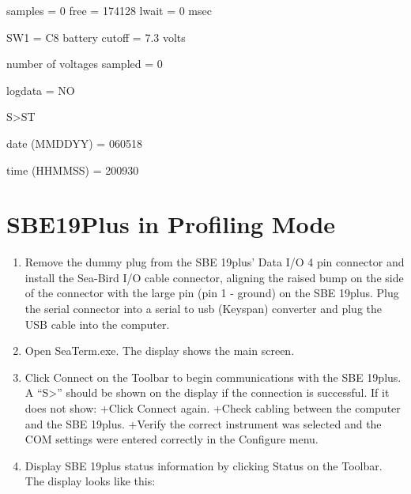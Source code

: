 \documentclass[]{book}
\providecommand{\tightlist}{%
  \setlength{\itemsep}{0pt}\setlength{\parskip}{0pt}}
\begin{document}
samples = 0 free = 174128 lwait = 0 msec

SW1 = C8 battery cutoff = 7.3 volts

number of voltages sampled = 0

logdata = NO

S\textgreater ST

date (MMDDYY) = 060518

time (HHMMSS) = 200930

\hypertarget{sbe19plus-in-profiling-mode}{%
\section{SBE19Plus in Profiling Mode}\label{sbe19plus-in-profiling-mode}}

\begin{enumerate}
\def\labelenumi{\arabic{enumi}.}
\tightlist
\item
  Remove the dummy plug from the SBE 19plus' Data I/O 4 pin connector and install the Sea-Bird I/O cable connector, aligning the raised bump on the side of the connector with the large pin (pin 1 - ground) on the SBE 19plus. Plug the serial connector into a serial to usb (Keyspan) converter and plug the USB cable into the computer.
\item
  Open SeaTerm.exe. The display shows the main screen.
\item
  Click Connect on the Toolbar to begin communications with the SBE 19plus. A ``S\textgreater{}'' should be shown on the display if the connection is successful. If it does not show:
  +Click Connect again.
  +Check cabling between the computer and the SBE 19plus.
  +Verify the correct instrument was selected and the COM settings were entered correctly in the Configure menu.
\item
  Display SBE 19plus status information by clicking Status on the Toolbar. The display looks like this:


\end{enumerate}
\end{document}
